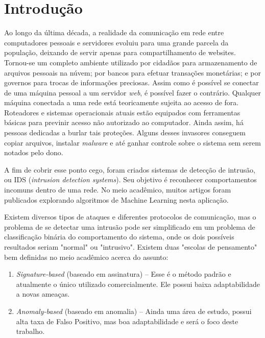 \chapter{Introdução}
\label{ch:introducao}

Ao longo da última década, a realidade da comunicação em rede entre computadores pessoais e servidores evoluiu
para uma grande parcela da população, deixando de servir apenas para compartilhamento de websites.
Tornou-se um completo ambiente utilizado por cidadãos para armazenamento de arquivos pessoais na núvem;
por bancos para efetuar transações monetárias; e por governos para trocas de informações preciosas.
Assim como é possível se conectar de uma máquina pessoal a um servidor \textit{web}, é possível fazer o contrário.
Qualquer máquina conectada a uma rede está teoricamente sujeita ao acesso de fora.
Roteadores e sistemas operacionais atuais estão equipados com ferramentas básicas para previnir acesso não autorizado
ao computador. Ainda assim, há pessoas dedicadas a burlar tais proteções. Alguns desses invasores conseguem copiar
arquivos, instalar \textit{malware} e até ganhar controle sobre o sistema sem serem notados pelo dono.
\par A fim de cobrir esse ponto cego, foram criados sistemas de detecção de intrusão, ou IDS
(\textit{intrusion detection systems}). Seu objetivo é reconhecer comportamentos incomuns dentro de uma rede.
No meio acadêmico, muitos artigos foram publicados explorando algoritmos de Machine Learning nesta aplicação.
\par Existem diversos tipos de ataques e diferentes protocolos de comunicação, mas o problema de se detectar uma
intrusão pode ser simplificado em um problema de classificação binária do comportamento do sistema, onde os dois
possíveis resultados seriam "normal" ou "intrusivo". Existem duas "escolas de pensamento" bem definidas no meio
acadêmico acerca do assunto:
\begin{enumerate}
    \item \textit{Signature-based} (baseado em assinatura) -- Esse é o método padrão e atualmente o único utilizado
    comercialmente. Ele possui baixa adaptabilidade a novas ameaças.
    \item \textit{Anomaly-based} (baseado em anomalia) -- Ainda uma área de estudo, possui alta taxa de
    Falso Positivo, mas boa adaptabilidade e será o foco deste trabalho.
\end{enumerate}
